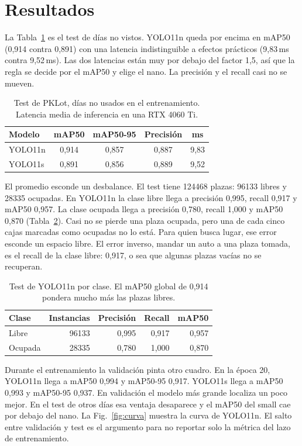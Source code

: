 \documentclass[conference,a4paper]{IEEEtran}
\begin{document}
\section{Resultados}
La Tabla~\ref{tab:test} es el test de días no vistos. YOLO11n queda por encima en mAP50 (0,914 contra 0,891) con una latencia indistinguible a efectos prácticos (9,83\,ms contra 9,52\,ms). Las dos latencias están muy por debajo del factor 1,5, así que la regla se decide por el mAP50 y elige el nano. La precisión y el recall casi no se mueven.

\begin{table}[t]
\caption{Test de PKLot, días no usados en el entrenamiento. Latencia media de inferencia en una RTX 4060 Ti.}
\label{tab:test}
\centering
\begin{tabular}{lcccc}
\toprule
Modelo & mAP50 & mAP50-95 & Precisión & ms \\
\midrule
YOLO11n & 0,914 & 0,857 & 0,887 & 9,83 \\
YOLO11s & 0,891 & 0,856 & 0,889 & 9,52 \\
\bottomrule
\end{tabular}
\end{table}

El promedio esconde un desbalance. El test tiene 124468 plazas: 96133 libres y 28335 ocupadas. En YOLO11n la clase libre llega a precisión 0,995, recall 0,917 y mAP50 0,957. La clase ocupada llega a precisión 0,780, recall 1,000 y mAP50 0,870 (Tabla~\ref{tab:clases}). Casi no se pierde una plaza ocupada, pero una de cada cinco cajas marcadas como ocupadas no lo está. Para quien busca lugar, ese error esconde un espacio libre. El error inverso, mandar un auto a una plaza tomada, es el recall de la clase libre: 0,917, o sea que algunas plazas vacías no se recuperan.

\begin{table}[t]
\caption{Test de YOLO11n por clase. El mAP50 global de 0,914 pondera mucho más las plazas libres.}
\label{tab:clases}
\centering
\begin{tabular}{lrrrr}
\toprule
Clase & Instancias & Precisión & Recall & mAP50 \\
\midrule
Libre & 96133 & 0,995 & 0,917 & 0,957 \\
Ocupada & 28335 & 0,780 & 1,000 & 0,870 \\
\bottomrule
\end{tabular}
\end{table}

Durante el entrenamiento la validación pinta otro cuadro. En la época 20, YOLO11n llega a mAP50 0,994 y mAP50-95 0,917. YOLO11s llega a mAP50 0,993 y mAP50-95 0,937. En validación el modelo más grande localiza un poco mejor. En el test de otros días esa ventaja desaparece y el mAP50 del small cae por debajo del nano. La Fig.~\ref{fig:curva} muestra la curva de YOLO11n. El salto entre validación y test es el argumento para no reportar solo la métrica del lazo de entrenamiento.
\end{document}
